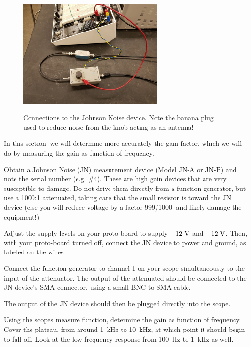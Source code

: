 \documentclass[12pt]{article}
\begin{document}
\begin{figure}[htbp]
\begin{center}
{\includegraphics[width=0.65\textwidth]{figs/jn_setup.jpg}}
\end{center}
\caption{\label{fig:plan} Connections to the Johnson Noise device.  Note the banana plug used to reduce noise from the knob acting as an antenna!}
\end{figure}



In this section, we will determine more accurately the gain factor, which we will do by measuring the gain as function of frequency.

Obtain a Johnson Noise (JN) measurement device (Model JN-A or JN-B) and note the serial number (e.g. \#4).  These are high gain devices that are very susceptible to damage.
Do not drive them directly from a function generator, but use a 1000:1 attenuated, taking care that the small resistor is toward the JN device (else you will reduce voltage by a factor 999/1000, and likely damage the equipment!)  

Adjust the supply levels on your proto-board to supply $+12~{\rm V}$ and $-12~{\rm V}$.  Then, with your proto-board turned off, connect the JN device to power and ground, as labeled on the wires.

Connect the function generator to channel 1 on your scope simultaneously to the input of the attenuator.  The output of the attenuated should be connected to the JN device's SMA connector, using a small BNC to SMA cable.

The output of the JN device should then be plugged directly into the scope.

Using the scopes measure function, determine the gain as function of frequency.  Cover the plateau, from around 1~kHz to 10~kHz, at which point it should begin to fall off.  Look at the low frequency response from 100~Hz to 1~kHz as well.
\end{document}
